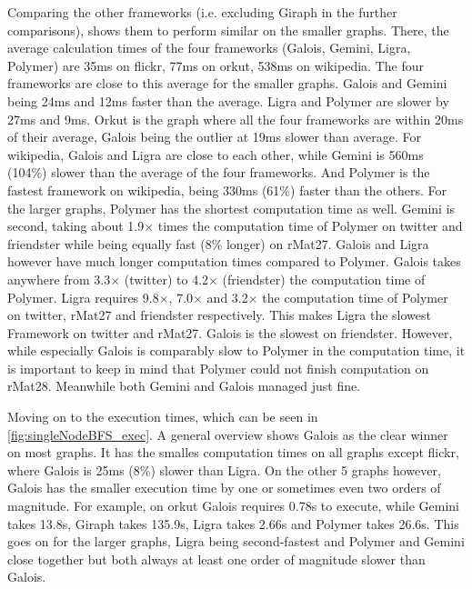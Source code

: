 Comparing the other frameworks (i.e. excluding Giraph in the further comparisons), shows them to perform similar on the smaller graphs. There, the average calculation times of the four frameworks (Galois, Gemini, Ligra, Polymer) are 35ms on flickr, 77ms on orkut, 538ms on wikipedia. 
The four frameworks are close to this average for the smaller graphs. Galois and Gemini being 24ms and 12ms faster than the average. Ligra and Polymer are slower by 27ms and 9ms.
Orkut is the graph where all the four frameworks are within 20ms of their average, Galois being the outlier at 19ms slower than average.
For wikipedia, Galois and Ligra are close to each other, while Gemini is 560ms (104\%) slower than the average of the four frameworks.
And Polymer is the fastest framework on wikipedia, being 330ms (61\%) faster than the others.
For the larger graphs, Polymer has the shortest computation time as well. Gemini is second, taking about 1.9$\times$ times the computation time of Polymer on twitter and friendster while being equally fast (8\% longer) on rMat27. Galois and Ligra however have much longer computation times compared to Polymer. Galois takes anywhere from 3.3$\times$ (twitter) to 4.2$\times$ (friendster) the computation time of Polymer.
Ligra requires 9.8$\times$, 7.0$\times$ and 3.2$\times$ the computation time of Polymer on twitter, rMat27 and friendster respectively. This makes Ligra the slowest Framework on twitter and rMat27. Galois is the slowest on friendster.
However, while especially Galois is comparably slow to Polymer in the computation time, it is important to keep in mind that Polymer could not finish computation on rMat28. Meanwhile both Gemini and Galois managed just fine.

Moving on to the execution times, which can be seen in \autoref{fig:singleNodeBFS_exec}. 
A general overview shows Galois as the clear winner on most graphs. It has the smalles computation times on all graphs except flickr, where Galois is 25ms (8\%) slower than Ligra. 
On the other 5 graphs however, Galois has the smaller execution time by one or sometimes even two orders of magnitude. 
For example, on orkut Galois requires 0.78s to execute, while Gemini takes 13.8s, Giraph takes 135.9s, Ligra takes 2.66s and Polymer takes 26.6s.
This goes on for the larger graphs, Ligra being second-fastest and Polymer and Gemini close together but both always at least one order of magnitude slower than Galois.


